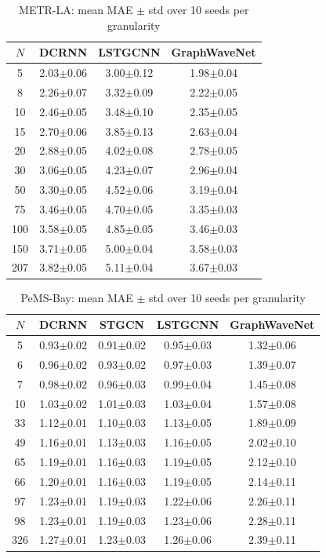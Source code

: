 \documentclass[letterpaper]{article}
\begin{document}
\begin{table}[t]
\small
\centering
\caption{METR-LA: mean MAE $\pm$ std over 10 seeds per granularity}
\label{tab:metr_full}
\begin{tabular}{cccc}
\toprule
$N$ & DCRNN & LSTGCNN & GraphWaveNet \\
\midrule
5   & 2.03$\pm$0.06 & 3.00$\pm$0.12 & 1.98$\pm$0.04 \\
8   & 2.26$\pm$0.07 & 3.32$\pm$0.09 & 2.22$\pm$0.05 \\
10  & 2.46$\pm$0.05 & 3.48$\pm$0.10 & 2.35$\pm$0.05 \\
15  & 2.70$\pm$0.06 & 3.85$\pm$0.13 & 2.63$\pm$0.04 \\
20  & 2.88$\pm$0.05 & 4.02$\pm$0.08 & 2.78$\pm$0.05 \\
30  & 3.06$\pm$0.05 & 4.23$\pm$0.07 & 2.96$\pm$0.04 \\
50  & 3.30$\pm$0.05 & 4.52$\pm$0.06 & 3.19$\pm$0.04 \\
75  & 3.46$\pm$0.05 & 4.70$\pm$0.05 & 3.35$\pm$0.03 \\
100 & 3.58$\pm$0.05 & 4.85$\pm$0.05 & 3.46$\pm$0.03 \\
150 & 3.71$\pm$0.05 & 5.00$\pm$0.04 & 3.58$\pm$0.03 \\
207 & 3.82$\pm$0.05 & 5.11$\pm$0.04 & 3.67$\pm$0.03 \\
\bottomrule
\end{tabular}
\end{table}

\begin{table}[t]
\small
\centering
\caption{PeMS-Bay: mean MAE $\pm$ std over 10 seeds per granularity}
\label{tab:pems_full}
\begin{tabular}{ccccc}
\toprule
$N$ & DCRNN & STGCN & LSTGCNN & GraphWaveNet \\
\midrule
5   & 0.93$\pm$0.02 & 0.91$\pm$0.02 & 0.95$\pm$0.03 & 1.32$\pm$0.06 \\
6   & 0.96$\pm$0.02 & 0.93$\pm$0.02 & 0.97$\pm$0.03 & 1.39$\pm$0.07 \\
7   & 0.98$\pm$0.02 & 0.96$\pm$0.03 & 0.99$\pm$0.04 & 1.45$\pm$0.08 \\
10  & 1.03$\pm$0.02 & 1.01$\pm$0.03 & 1.03$\pm$0.04 & 1.57$\pm$0.08 \\
33  & 1.12$\pm$0.01 & 1.10$\pm$0.03 & 1.13$\pm$0.05 & 1.89$\pm$0.09 \\
49  & 1.16$\pm$0.01 & 1.13$\pm$0.03 & 1.16$\pm$0.05 & 2.02$\pm$0.10 \\
65  & 1.19$\pm$0.01 & 1.16$\pm$0.03 & 1.19$\pm$0.05 & 2.12$\pm$0.10 \\
66  & 1.20$\pm$0.01 & 1.16$\pm$0.03 & 1.19$\pm$0.05 & 2.14$\pm$0.11 \\
97  & 1.23$\pm$0.01 & 1.19$\pm$0.03 & 1.22$\pm$0.06 & 2.26$\pm$0.11 \\
98  & 1.23$\pm$0.01 & 1.19$\pm$0.03 & 1.23$\pm$0.06 & 2.28$\pm$0.11 \\
326 & 1.27$\pm$0.01 & 1.23$\pm$0.03 & 1.26$\pm$0.06 & 2.39$\pm$0.11 \\
\bottomrule
\end{tabular}
\end{table}
\end{document}
